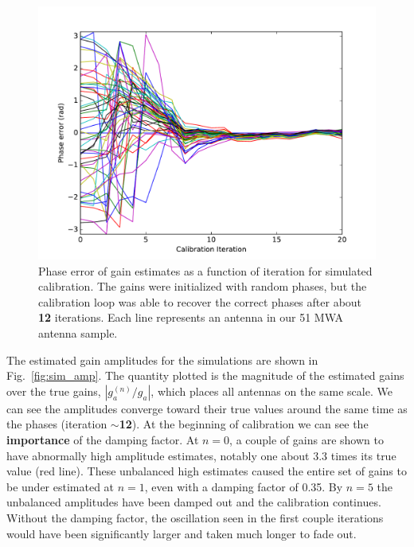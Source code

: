 \documentclass[a4paper,fleqn,usenatbib]{../mnras}
\begin{document}
\begin{figure}
\begin{center}
\includegraphics[width=\columnwidth]{fig3.pdf}
\caption{Phase error of gain estimates as a function of iteration for simulated calibration. The 
gains were initialized with random phases, but the calibration loop was able to recover the 
correct phases after about \textbf{12} iterations. Each line represents an antenna in our 51 MWA 
antenna sample.
}
\label{fig:sim_phase}
\end{center}
\end{figure}

The estimated gain amplitudes for the simulations are shown in Fig.~\ref{fig:sim_amp}. The 
quantity plotted is the magnitude of the estimated gains over the true gains, $\left|g^{(n)}_a/
g_a\right|$, which places all antennas on the same scale. We can see the amplitudes 
converge toward their true values around the same time as the phases (iteration \textbf{$\sim$12}). At 
the beginning of calibration we can see the \textbf{importance} of the damping factor. At $n=0$, a couple of 
gains are shown to have abnormally high amplitude estimates, notably one about 3.3 times its 
true value (red line). These unbalanced high estimates caused the entire set of gains to be 
under estimated at $n=1$, even with a damping factor of 0.35. By $n=5$ the unbalanced 
amplitudes have been damped out and the calibration continues. Without the damping factor, 
the oscillation seen in the first couple iterations would have been significantly larger and taken 
much longer to fade out. 
\end{document}
